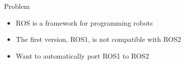 \documentclass[final]{beamer}
\newlength{\onecolwid}
\begin{document}
\begin{frame}[t]
\begin{columns}[t]
\begin{column}{\onecolwid}
\begin{alertblock}{Problem}
\begin{itemize}
\item ROS is a framework for programming robots
\item The first version, ROS1, is not compatible with ROS2
\item Want to automatically port ROS1 to ROS2
\end{itemize}

\end{alertblock}





\end{column}
\end{columns}
\end{frame}
\end{document}
